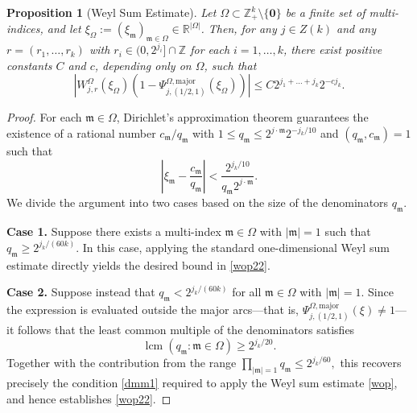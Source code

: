 \documentclass[11 pt,letterpaper]{amsart}
\theoremstyle{plain}
\newtheorem{proposition}{Proposition}\numberwithin{proposition}{section}
\theoremstyle{definition}
\theoremstyle{remark} \theoremstyle{exam} \theoremstyle{ob}
\numberwithin{equation}{section}
\begin{document}
 \begin{proposition}[Weyl Sum Estimate]\label{ws1}
Let $\Omega \subset \mathbb{Z}_+^k \setminus \{\mathbf{0}\}$ be a finite set of multi-indices, and let $\xi_{\Omega} := (\xi_{\mathfrak{m}})_{\mathfrak{m} \in \Omega} \in \mathbb{R}^{|\Omega|}$.   Then, for any $j \in  Z(k)$ and any $r = (r_1, \dots, r_k)$ with $r_i \in (0, 2^{j_i}] \cap \mathbb{Z}$ for each $i = 1, \dots, k$, there exist positive constants $C$ and $c$, depending only on $\Omega$, such that
\begin{equation}\label{wop22}
\left| W_{j,r}^{\Omega}(\xi_\Omega) \left( 1 - \Psi_{j,(1/2,1)}^{\Omega,\mathrm{major}}(\xi_{\Omega}) \right) \right| \le C 2^{j_1 + \dots + j_k} 2^{-c j_k}.
\end{equation}
\end{proposition}

\begin{proof}
For each $\mathfrak{m} \in \Omega$, Dirichlet's approximation theorem guarantees the existence of a rational number $c_{\mathfrak{m}}/q_{\mathfrak{m}}$ with $1 \le q_{\mathfrak{m}} \le 2^{j \cdot \mathfrak{m}} 2^{-j_k/10}$ and $(q_{\mathfrak{m}}, c_{\mathfrak{m}}) = 1$ such that
\[
\left| \xi_{\mathfrak{m}} - \frac{c_{\mathfrak{m}}}{q_{\mathfrak{m}}} \right| < \frac{2^{j_k/10}}{q_{\mathfrak{m}} 2^{j \cdot \mathfrak{m}}}.
\]
We divide the argument into two cases based on the size of the denominators $q_{\mathfrak{m}}$.

\medskip
\noindent\textbf{Case 1.} Suppose there exists a multi-index $\mathfrak{m} \in \Omega$ with $|\mathfrak{m}| = 1$ such that $q_{\mathfrak{m}} \ge 2^{j_k/(60k)} $. In this case, applying the standard one-dimensional Weyl sum estimate directly yields the desired bound in \eqref{wop22}.

\medskip
\noindent\textbf{Case 2.} Suppose instead that $q_{\mathfrak{m}} < 2^{j_k/(60k)} $ for all $\mathfrak{m} \in \Omega$ with $|\mathfrak{m}| = 1$. Since the expression is evaluated outside the major arcs—that is, $\Psi_{j,(1/2,1)}^{\Omega,\mathrm{major}}(\xi) \neq 1$—it follows that the least common multiple of the denominators satisfies
\[
\operatorname{lcm}(q_{\mathfrak{m}} : \mathfrak{m} \in \Omega) \ge 2^{j_k/20}.
\]
Together with the contribution from the range
$\prod_{|\mathfrak{m}|=1} q_{\mathfrak{m}}
\leq 2^{j_k/60},$
this recovers precisely the condition \eqref{dmm1} required to apply the
Weyl sum estimate \eqref{wop}, and hence establishes \eqref{wop22}.




\end{proof}
 
\end{document}
